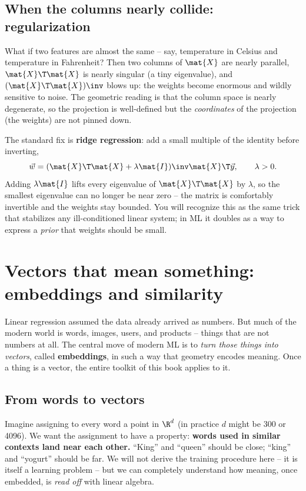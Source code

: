 \subsection{When the columns nearly collide: regularization}

What if two features are almost the same -- say, temperature in Celsius and temperature
in Fahrenheit? Then two columns of $\mat{X}$ are nearly parallel, $\mat{X}\T\mat{X}$ is
nearly singular (a tiny eigenvalue), and $(\mat{X}\T\mat{X})\inv$ blows up: the weights
become enormous and wildly sensitive to noise. The geometric reading is that the column
space is nearly degenerate, so the projection is well-defined but the \emph{coordinates}
of the projection (the weights) are not pinned down.

The standard fix is \textbf{ridge regression}: add a small multiple of the identity
before inverting,
\[
\vec{w} = (\mat{X}\T\mat{X} + \lambda \mat{I})\inv \mat{X}\T\vec{y}, \qquad \lambda > 0.
\]
Adding $\lambda\mat{I}$ lifts every eigenvalue of $\mat{X}\T\mat{X}$ by $\lambda$, so the
smallest eigenvalue can no longer be near zero -- the matrix is comfortably invertible
and the weights stay bounded. You will recognize this as the same trick that stabilizes
any ill-conditioned linear system; in ML it doubles as a way to express a \emph{prior}
that weights should be small.

\section{Vectors that mean something: embeddings and similarity}
\label{ch34:embeddings}

Linear regression assumed the data already arrived as numbers. But much of the modern
world is words, images, users, and products -- things that are not numbers at all. The
central move of modern ML is to \emph{turn those things into vectors}, called
\textbf{embeddings}, in such a way that geometry encodes meaning. Once a thing is a
vector, the entire toolkit of this book applies to it.

\subsection{From words to vectors}

Imagine assigning to every word a point in $\R^{d}$ (in practice $d$ might be 300 or
4096). We want the assignment to have a property: \textbf{words used in similar contexts
land near each other.} ``King'' and ``queen'' should be close; ``king'' and ``yogurt''
should be far. We will not derive the training procedure here -- it is itself a learning
problem -- but we can completely understand how meaning, once embedded, is \emph{read
off} with linear algebra.

